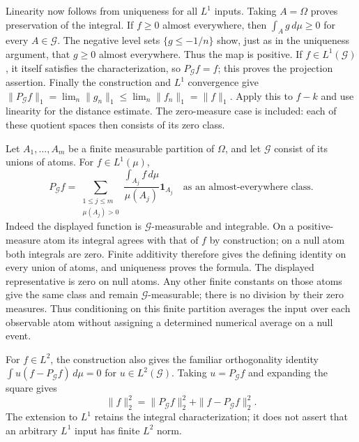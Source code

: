 Linearity now follows from uniqueness for all $L^1$ inputs. Taking
$A=\Omega$ proves preservation of the integral. If $f\geq0$ almost
everywhere, then $\int_Ag\,d\mu\geq0$ for every $A\in\mathcal G$.
The negative level sets $\{g\leq-1/n\}$ show, just as in the
uniqueness argument, that $g\geq0$ almost everywhere. Thus the map
is positive. If $f\in L^1(\mathcal G)$, it itself satisfies the
characterization, so $P_{\mathcal G}f=f$; this proves the projection
assertion. Finally the construction and $L^1$ convergence give
$\|P_{\mathcal G}f\|_1=\lim_n\|g_n\|_1\leq\lim_n\|f_n\|_1
=\|f\|_1$. Apply this to $f-k$ and use linearity for the distance
estimate. The zero-measure case is included: each of these quotient
spaces then consists of its zero class.
\Done

\begin{example}
Let $A_1,\ldots,A_m$ be a finite measurable partition of $\Omega$,
and let $\mathcal G$ consist of its unions of atoms. For $f\in L^1(\mu)$,
\[
P_{\mathcal G}f
=\sum_{\substack{1\leq j\leq m\\\mu(A_j)>0}}
 \frac{\int_{A_j}f\,d\mu}{\mu(A_j)}\mathbf1_{A_j}
\quad\text{as an almost-everywhere class}.
\]
Indeed the displayed function is $\mathcal G$-measurable and integrable.
On a positive-measure atom its integral agrees with that of $f$ by
construction; on a null atom both integrals are zero. Finite additivity
therefore gives the defining identity on every union of atoms, and
uniqueness proves the formula. The displayed representative is zero on
null atoms. Any other finite constants on those atoms give the same
class and remain $\mathcal G$-measurable; there is no division by their
zero measures. Thus conditioning on this finite partition averages the
input over each observable atom without assigning a determined numerical
average on a null event.
\end{example}

For $f\in L^2$, the construction also gives the familiar orthogonality
identity $\int u(f-P_{\mathcal G}f)\,d\mu=0$ for
$u\in L^2(\mathcal G)$. Taking $u=P_{\mathcal G}f$ and expanding
the square gives
\[
\|f\|_2^2=\|P_{\mathcal G}f\|_2^2+
                 \|f-P_{\mathcal G}f\|_2^2.
\]
The extension to $L^1$ retains the integral characterization; it does
not assert that an arbitrary $L^1$ input has finite $L^2$ norm.


